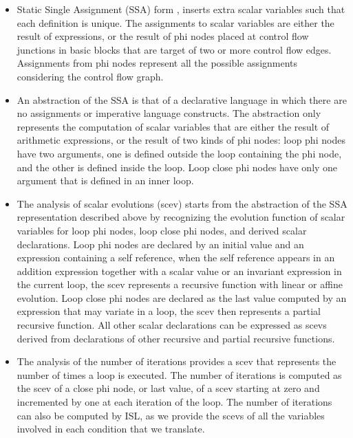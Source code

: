 \documentclass{sig-alternate}
\begin{document}
\begin{itemize}
\item Static Single Assignment (SSA) form \cite{cytron}, inserts extra scalar
  variables such that each definition is unique.  The assignments to scalar
  variables are either the result of expressions, or the result of phi nodes
  placed at control flow junctions in basic blocks that are target of two or
  more control flow edges.  Assignments from phi nodes represent all the
  possible assignments considering the control flow graph.

\item An abstraction of the SSA is that of a declarative language
  \cite{spop2007} in which there are no assignments or imperative language
  constructs.  The abstraction only represents the computation of scalar
  variables that are either the result of arithmetic expressions, or the result
  of two kinds of phi nodes: loop phi nodes have two arguments, one is defined
  outside the loop containing the phi node, and the other is defined inside the
  loop.  Loop close phi nodes have only one argument that is defined in an inner
  loop.

\item The analysis of scalar evolutions (scev) \cite{scev} starts from the
  abstraction of the SSA representation described above by recognizing the
  evolution function of scalar variables for loop phi nodes, loop close phi
  nodes, and derived scalar declarations.  Loop phi nodes are declared by an
  initial value and an expression containing a self reference, when the self
  reference appears in an addition expression together with a scalar value or an
  invariant expression in the current loop, the scev represents a recursive
  function with linear or affine evolution.  Loop close phi nodes are declared
  as the last value computed by an expression that may variate in a loop, the
  scev then represents a partial recursive function.  All other scalar
  declarations can be expressed as scevs derived from declarations of other
  recursive and partial recursive functions.

\item The analysis of the number of iterations \cite{scev} provides a scev that
  represents the number of times a loop is executed.  The number of iterations
  is computed as the scev of a close phi node, or last value, of a scev starting
  at zero and incremented by one at each iteration of the loop.  The number of
  iterations can also be computed by ISL, as we provide the scevs of all the
  variables involved in each condition that we translate.


\end{itemize}
\end{document}
